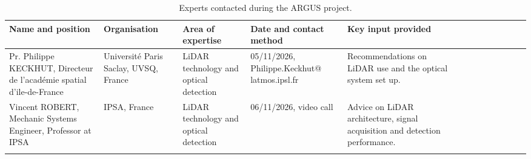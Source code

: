 \documentclass[11pt,a4paper]{article}
\begin{document}
\Needspace{8cm}
\begin{table}[H]
  \centering
  \footnotesize
  \caption{Experts contacted during the ARGUS project.}
  \label{tab:experts}
  \begin{tabular}{
    p{2.8cm}
    p{3.2cm}
    p{3.0cm}
    p{2.3cm}
    p{3.4cm}
  }
    \toprule
    \textbf{Name and position} &
    \textbf{Organisation} &
    \textbf{Area of expertise} &
    \textbf{Date and contact method} &
    \textbf{Key input provided} \\
    \midrule

    Pr. Philippe KECKHUT,
    Directeur de l'académie spatial d'ile-de-France
    &
    Université Paris Saclay, 
    UVSQ, France
    &
    LiDAR technology and optical detection
    &
    05/11/2026, 
    Philippe.Keckhut@
    latmos.ipsl.fr
    &
    Recommendations on LiDAR use and the optical system set up.\\

    \addlinespace

    Vincent ROBERT,
    Mechanic Systems Engineer,
    Professor at IPSA
    &
    IPSA, France
    &
    LiDAR technology and optical detection
    &
    06/11/2026, video call
    &
    Advice on LiDAR architecture, signal acquisition and detection performance. \\

    \addlinespace

    &
    &
    &
    &

    \addlinespace

    &
    &
    &
    &

    \addlinespace

    &
    &
    &
    &

    \bottomrule
  \end{tabular}
\end{table}
\end{document}
